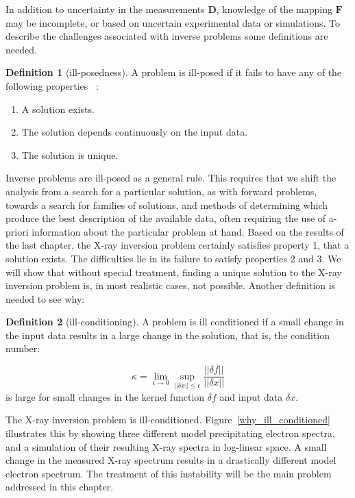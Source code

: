  In addition to uncertainty in the measurements $\mathbf{D}$, knowledge of the mapping $\mathbf{F}$ may be incomplete, or based on uncertain experimental data or simulations. To describe the challenges associated with inverse problems some definitions are needed.

\theoremstyle{definition}
\newtheorem{definition}{Definition}[section]
\begin{definition}[ill-posedness]
A problem is ill-posed if it fails to have any of the following properties~\cite{HADAMARD1902} : 
\begin{enumerate}
    \item A solution exists.
    \item The solution depends continuously on the input data.
    \item The solution is unique.
\end{enumerate}
\end{definition}

Inverse problems are ill-posed as a general rule. This requires that we shift the analysis from a search for a particular solution, as with forward problems, towards a search for families of solutions, and methods of determining which produce the best description of the available data, often requiring the use of a-priori information about the particular problem at hand. Based on the results of the last chapter, the X-ray inversion problem certainly satisfies property 1, that a solution exists. The difficulties lie in its failure to satisfy properties 2 and 3. We will show that without special treatment, finding a unique solution to the X-ray inversion problem is, in most realistic cases, not possible. Another definition is needed to see why:

\begin{definition}[ill-conditioning]
A problem is ill conditioned if a small change in the input data results in a large change in the solution, that is, the condition number\cite{Altman2016}:

$$\kappa = \lim_{\epsilon \to 0} \sup_{\vert\vert \delta x \vert \vert \leq \epsilon} \frac{\vert\vert \delta f \vert\vert}{\vert\vert \delta x \vert\vert}$$
is large for small changes in the kernel function $\delta f$ and input data $\delta x$.
\end{definition}

 The X-ray inversion problem is ill-conditioned. Figure~\ref{why_ill_conditioned} illustrates this by showing three different model precipitating electron spectra, and a simulation of their resulting X-ray spectra in log-linear space. A small change in the measured X-ray spectrum results in a drastically different model electron spectrum. The treatment of this instability will be the main problem addressed in this chapter. 

